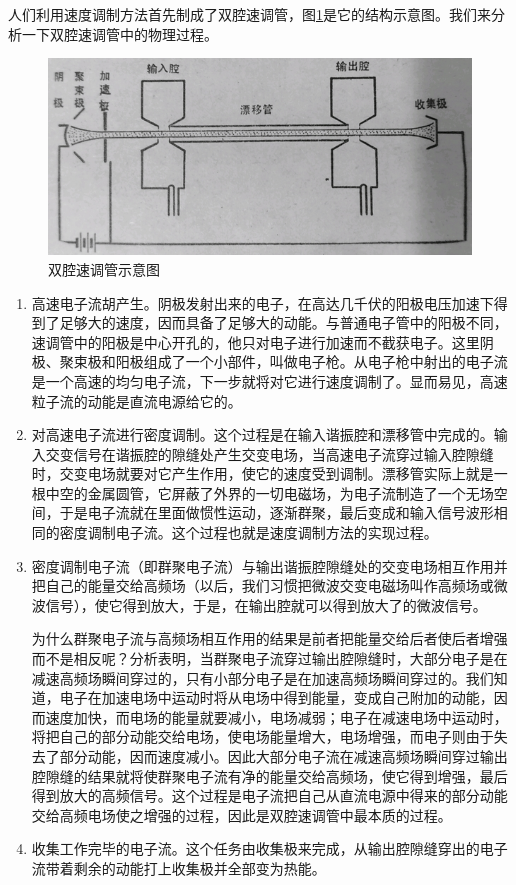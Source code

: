 人们利用速度调制方法首先制成了双腔速调管，图\ref{ch1-1}是它的结构示意图。我们来分析一下双腔速调管中的物理过程。

\begin{figure}[phtb]
	\centering
	\includegraphics[width=0.9\linewidth]{figure/ch1-1}
	\caption{双腔速调管示意图}
	\label{ch1-1}
\end{figure}

\begin{enumerate}
	\item 高速电子流胡产生。阴极发射出来的电子，在高达几千伏的阳极电压加速下得到了足够大的速度，因而具备了足够大的动能。与普通电子管中的阳极不同，速调管中的阳极是中心开孔的，他只对电子进行加速而不截获电子。这里阴极、聚束极和阳极组成了一个小部件，叫做电子枪。从电子枪中射出的电子流是一个高速的均匀电子流，下一步就将对它进行速度调制了。显而易见，高速粒子流的动能是直流电源给它的。
	\item 对高速电子流进行密度调制。这个过程是在输入谐振腔和漂移管中完成的。输入交变信号在谐振腔的隙缝处产生交变电场，当高速电子流穿过输入腔隙缝时，交变电场就要对它产生作用，使它的速度受到调制。漂移管实际上就是一根中空的金属圆管，它屏蔽了外界的一切电磁场，为电子流制造了一个无场空间，于是电子流就在里面做惯性运动，逐渐群聚，最后变成和输入信号波形相同的密度调制电子流。这个过程也就是速度调制方法的实现过程。
	\item 密度调制电子流（即群聚电子流）与输出谐振腔隙缝处的交变电场相互作用并把自己的能量交给高频场（以后，我们习惯把微波交变电磁场叫作高频场或微波信号），使它得到放大，于是，在输出腔就可以得到放大了的微波信号。
	
	为什么群聚电子流与高频场相互作用的结果是前者把能量交给后者使后者增强而不是相反呢？分析表明，当群聚电子流穿过输出腔隙缝时，大部分电子是在减速高频场瞬间穿过的，只有小部分电子是在加速高频场瞬间穿过的。我们知道，电子在加速电场中运动时将从电场中得到能量，变成自己附加的动能，因而速度加快，而电场的能量就要减小，电场减弱；电子在减速电场中运动时，将把自己的部分动能交给电场，使电场能量增大，电场增强，而电子则由于失去了部分动能，因而速度减小。因此大部分电子流在减速高频场瞬间穿过输出腔隙缝的结果就将使群聚电子流有净的能量交给高频场，使它得到增强，最后得到放大的高频信号。这个过程是电子流把自己从直流电源中得来的部分动能交给高频电场使之增强的过程，因此是双腔速调管中最本质的过程。	
	\item 收集工作完毕的电子流。这个任务由收集极来完成，从输出腔隙缝穿出的电子流带着剩余的动能打上收集极并全部变为热能。
\end{enumerate}


